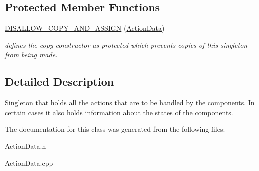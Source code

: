 \subsection*{\-Protected \-Member \-Functions}
\begin{DoxyCompactItemize}
\item 
\hypertarget{class_action_data_aca5ee1ff9eb13b53acb7ccc0026166ff}{
\hyperlink{class_action_data_aca5ee1ff9eb13b53acb7ccc0026166ff}{\-D\-I\-S\-A\-L\-L\-O\-W\-\_\-\-C\-O\-P\-Y\-\_\-\-A\-N\-D\-\_\-\-A\-S\-S\-I\-G\-N} (\hyperlink{class_action_data}{\-Action\-Data})}
\label{class_action_data_aca5ee1ff9eb13b53acb7ccc0026166ff}

\begin{DoxyCompactList}\small\item\em defines the copy constructor as protected which prevents copies of this singleton from being made. \end{DoxyCompactList}\end{DoxyCompactItemize}


\subsection{\-Detailed \-Description}
\-Singleton that holds all the actions that are to be handled by the components. \-In certain cases it also holds information about the states of the components. 

\-The documentation for this class was generated from the following files\-:\begin{DoxyCompactItemize}
\item 
\-Action\-Data.\-h\item 
\-Action\-Data.\-cpp\end{DoxyCompactItemize}
